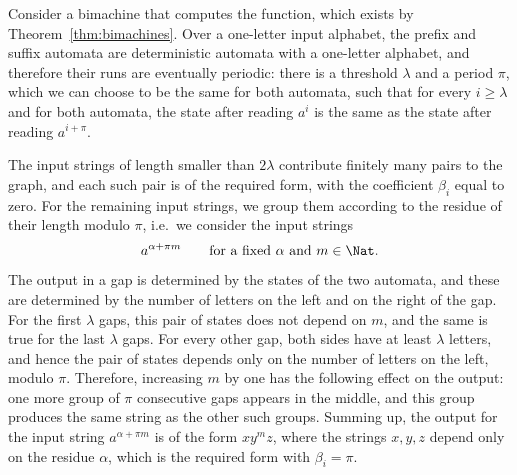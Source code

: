 {
    Consider a bimachine that computes the function, which exists by Theorem~\ref{thm:bimachines}. Over a one-letter input alphabet, the prefix and suffix automata are deterministic automata with a one-letter alphabet, and therefore their runs are eventually periodic: there is a threshold $\lambda$ and a period $\pi$, which we can choose to be the same for both automata, such that for every $i \geq \lambda$ and for both automata, the state after reading $a^i$ is the same as the state after reading $a^{i+\pi}$.

    The input strings of length smaller than $2\lambda$ contribute finitely many pairs to the graph, and each such pair is of the required form, with the coefficient $\beta_i$ equal to zero. For the remaining input strings, we group them according to the residue of their length modulo $\pi$, i.e.~we consider the input strings
    \begin{align*}
    a^{\alpha + \pi m} \qquad \text{for a fixed $\alpha$ and $m \in \Nat$}.
    \end{align*}
    The output in a gap is determined by the states of the two automata, and these are determined by the number of letters on the left and on the right of the gap. For the first $\lambda$ gaps, this pair of states does not depend on $m$, and the same is true for the last $\lambda$ gaps. For every other gap, both sides have at least $\lambda$ letters, and hence the pair of states depends only on the number of letters on the left, modulo $\pi$. Therefore, increasing $m$ by one has the following effect on the output: one more group of $\pi$ consecutive gaps appears in the middle, and this group produces the same string as the other such groups. Summing up, the output for the input string $a^{\alpha+\pi m}$ is of the form $x y^m z$, where the strings $x,y,z$ depend only on the residue $\alpha$, which is the required form with $\beta_i = \pi$.
}

